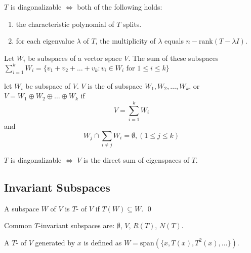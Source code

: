 \begin{theorem}
    $T$ is diagonalizable $\iff$ both of the following holds:
    \begin{enumerate}
        \item the characteristic polynomial of $T$ splits.
        \item for each eigenvalue $\lambda$ of $T$, the multiplicity of $\lambda$ equals $n - \text{rank}(T - \lambda I)$.
    \end{enumerate}
\end{theorem}

\begin{definition}
    Let $W_i$ be subspaces of a vector space $V$. The sum of these subspaces $\sum\limits_{i=1}^k W_i = \{ v_1 + v_2 + \dots + v_k : v_i \in W_i \text{ for } 1 \leq i \leq k \}$
\end{definition}

\begin{definition}
    let $W_i$ be subspace of $V$. $V$ is the  of subspace $W_1, W_2, \dots, W_k$, or $V = W_1 \oplus W_2 \oplus \dots \oplus W_k$ if
    \begin{equation*}
        V = \sum_{i=1}^k W_i
    \end{equation*}
    and 
    \begin{equation*}
        W_j \cap \sum_{i \neq j} W_i = \emptyset, (1 \leq j \leq k)
    \end{equation*}
\end{definition}

\begin{theorem}
    $T$ is diagonalizable $\iff$ $V$ is the direct sum of eigenspaces of $T$.
\end{theorem}


\subsection{Invariant Subspaces}

\begin{definition}
    A subspace $W$ of $V$ is $T$- of $V$ if $T(W) \subseteq W$.
    \qed
\end{definition}

Common $T$-invariant subspaces are: $\emptyset$, $V$, $R(T)$, $N(T)$.


\begin{definition}
    A $T$- of $V$ generated by $x$ is defined as $W=\text{span}(\{x, T(x), T^2(x), \dots \})$.
\end{definition}

